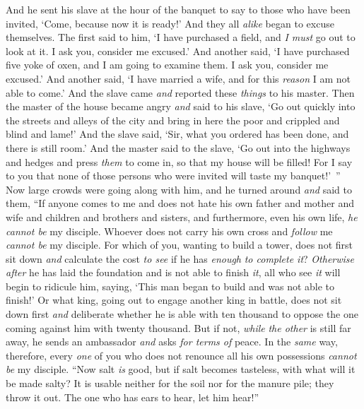 \begin{biblechapter}
\verse And he sent his slave at the hour of the banquet to say to those who have been invited, ‘Come, because now it is ready!’
\verse And they all \textit{alike} began to excuse themselves. The first said to him, ‘I have purchased a field, and \textit{I must} go out to look at it. I ask you, consider me excused.’
\verse And another said, ‘I have purchased five yoke of oxen, and I am going to examine them. I ask you, consider me excused.’
\verse And another said, ‘I have married a wife, and for this \textit{reason} I am not able to come.’
\verse And the slave came \textit{and} reported these \textit{things} to his master. Then the master of the house became angry \textit{and} said to his slave, ‘Go out quickly into the streets and alleys of the city and bring in here the poor and crippled and blind and lame!’
\verse And the slave said, ‘Sir, what you ordered has been done, and there is still room.’
\verse And the master said to the slave, ‘Go out into the highways and hedges and press \textit{them} to come in, so that my house will be filled!
\verse For I say to you that none of those persons who were invited will taste my banquet!’ ”
 Now large crowds were going along with him, and he turned around \textit{and} said to them,
\verse “If anyone comes to me and does not hate his own father and mother and wife and children and brothers and sisters, and furthermore, even his own life, \textit{he cannot be} my disciple.
\verse Whoever does not carry his own cross and \textit{follow} me \textit{cannot be} my disciple.
\verse For which of you, wanting to build a tower, does not first sit down \textit{and} calculate the cost \textit{to see} if he has \textit{enough} \textit{to complete it}?
\verse \textit{Otherwise} \textit{after} he has laid the foundation and is not able to finish \textit{it}, all who see \textit{it} will begin to ridicule him,
\verse saying, ‘This man began to build and was not able to finish!’
\verse Or what king, going out to engage another king in battle, does not sit down first \textit{and} deliberate whether he is able with ten thousand to oppose the one coming against him with twenty thousand.
\verse But if not, \textit{while} \textit{the other} is still far away, he sends an ambassador \textit{and} asks \textit{for terms of} peace.
\verse In the \textit{same} way, therefore, every \textit{one} of you who does not renounce all his own possessions \textit{cannot be} my disciple.
\verse “Now salt \textit{is} good, but if salt becomes tasteless, with what will it be made salty?
\verse It is usable neither for the soil nor for the manure pile; they throw it out. The one who has ears to hear, let him hear!”
\end{biblechapter}

